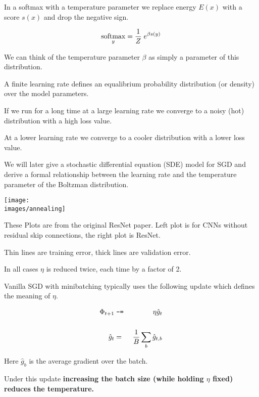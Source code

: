{In a softmax with a temperature parameter we replace energy $E(x)$ with a score $s(x)$ and drop the negative sign.

\vfill
$$\operatorname*{softmax}_y = \frac{1}{Z}\;e^{\beta s(y)}$$

\vfill
We can think of the temperature parameter $\beta$ as simply a parameter of this distribution.


A finite learning rate defines an equalibrium probability distribution (or density) over the model parameters.

\vfill
If we run for a long time at a large learning rate we converge to a noisy (hot) distribution with a high loss value.

\vfill
At a lower learning rate we converge to a cooler distribution with a lower loss value.

\vfill
We will later give a stochastic differential equation (SDE) model for SGD and derive a formal
relationship between the learning rate and the temperature parameter of the Boltzman distribution.


\centerline{\texttt{[image: \\images/annealing]}}

\vfill
These Plots are from the original ResNet paper.  Left plot is for CNNs without residual skip connections, the right plot is ResNet.

\vfill
Thin lines are training error, thick lines are validation error.

\vfill
In all cases $\eta$ is reduced twice, each time by a factor of 2.


Vanilla SGD with minibatching typically uses the following update which defines the meaning of $\eta$.

\begin{eqnarray*}
\Phi_{t+1} & \;\mbox{\tt -=}\; & \eta \hat{g}_t \\
\\
\hat{g}_t & = & \frac{1}{B} \sum_b \hat{g}_{t,b}
\end{eqnarray*}

\vfill
Here $\hat{g}_{b}$ is the average gradient over the batch.

\vfill
Under this update {\bf increasing the batch size (while holding $\eta$ fixed) reduces the temperature.}


}
